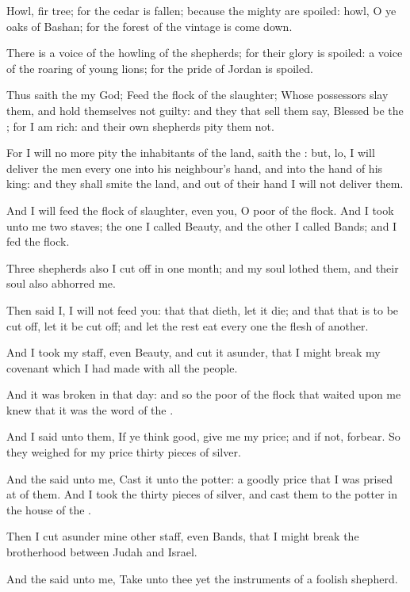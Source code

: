 \verse Howl, fir tree; for the cedar is fallen; because the mighty are spoiled: howl, O ye oaks of Bashan; for the forest of the vintage is come down.

\verse There is a voice of the howling of the shepherds; for their glory is spoiled: a voice of the roaring of young lions; for the pride of Jordan is spoiled.

\verse Thus saith the \LORD my God; Feed the flock of the slaughter; \verse Whose possessors slay them, and hold themselves not guilty: and they that sell them say, Blessed be the \LORD; for I am rich: and their own shepherds pity them not.

\verse For I will no more pity the inhabitants of the land, saith the \LORD: but, lo, I will deliver the men every one into his neighbour's hand, and into the hand of his king: and they shall smite the land, and out of their hand I will not deliver them.

\verse And I will feed the flock of slaughter, even you, O poor of the flock. And I took unto me two staves; the one I called Beauty, and the other I called Bands; and I fed the flock.

\verse Three shepherds also I cut off in one month; and my soul lothed them, and their soul also abhorred me.

\verse Then said I, I will not feed you: that that dieth, let it die; and that that is to be cut off, let it be cut off; and let the rest eat every one the flesh of another.

\verse And I took my staff, even Beauty, and cut it asunder, that I might break my covenant which I had made with all the people.

\verse And it was broken in that day: and so the poor of the flock that waited upon me knew that it was the word of the \LORD.

\verse And I said unto them, If ye think good, give me my price; and if not, forbear. So they weighed for my price thirty pieces of silver.

\verse And the \LORD said unto me, Cast it unto the potter: a goodly price that I was prised at of them. And I took the thirty pieces of silver, and cast them to the potter in the house of the \LORD.

\verse Then I cut asunder mine other staff, even Bands, that I might break the brotherhood between Judah and Israel.

\verse And the \LORD said unto me, Take unto thee yet the instruments of a foolish shepherd.

